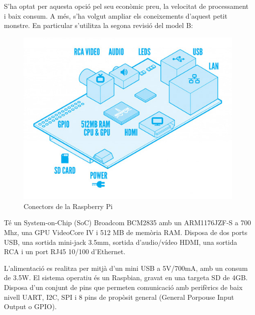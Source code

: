 \documentclass[twoside]{article}
\begin{document}
S'ha optat per aquesta opció pel seu econòmic preu, la velocitat de processament i baix consum. A més, s'ha volgut ampliar els coneixements d'aquest petit monstre. En particular s'utilitza la segona revisió del model B:

\begin{figure}[h!]
\begin{center}
\includegraphics[scale=0.3]{images/RPi2.jpg}
\caption{Conectors de la Raspberry Pi}
\label{RPiConn}
\end{center}
\end{figure}


Té un System-on-Chip (SoC) Broadcom BCM2835 amb un ARM1176JZF-S a 700 Mhz, una GPU VideoCore IV i 512 MB de memòria RAM. Disposa de dos ports USB, una sortida mini-jack 3.5mm, sortida d'audio/vídeo HDMI, una sortida RCA i un port RJ45 10/100 d'Ethernet. 

L'alimentació es realitza per mitjà d'un mini USB a 5V/700mA, amb un consum de 3.5W. El sistema operatiu és un Raspbian, gravat en una targeta SD de 4GB. Disposa d'un conjunt de pins que permeten comunicació amb perifèrics de baix nivell UART, I2C, SPI i 8 pins de propòsit general (General Porpouse Input Output o GPIO).
\end{document}
